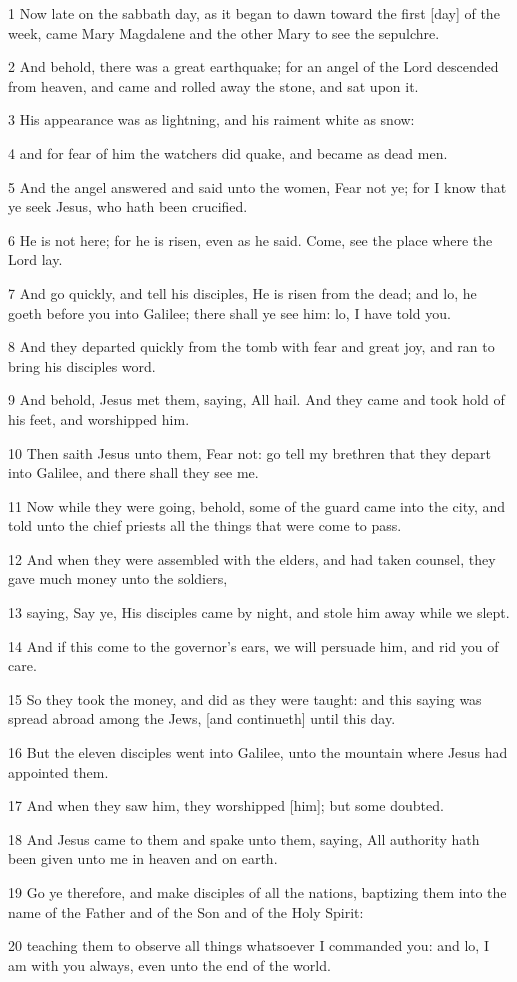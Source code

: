 \par 1 Now late on the sabbath day, as it began to dawn toward the first [day] of the week, came Mary Magdalene and the other Mary to see the sepulchre.
\par 2 And behold, there was a great earthquake; for an angel of the Lord descended from heaven, and came and rolled away the stone, and sat upon it.
\par 3 His appearance was as lightning, and his raiment white as snow:
\par 4 and for fear of him the watchers did quake, and became as dead men.
\par 5 And the angel answered and said unto the women, Fear not ye; for I know that ye seek Jesus, who hath been crucified.
\par 6 He is not here; for he is risen, even as he said. Come, see the place where the Lord lay.
\par 7 And go quickly, and tell his disciples, He is risen from the dead; and lo, he goeth before you into Galilee; there shall ye see him: lo, I have told you.
\par 8 And they departed quickly from the tomb with fear and great joy, and ran to bring his disciples word.
\par 9 And behold, Jesus met them, saying, All hail. And they came and took hold of his feet, and worshipped him.
\par 10 Then saith Jesus unto them, Fear not: go tell my brethren that they depart into Galilee, and there shall they see me.
\par 11 Now while they were going, behold, some of the guard came into the city, and told unto the chief priests all the things that were come to pass.
\par 12 And when they were assembled with the elders, and had taken counsel, they gave much money unto the soldiers,
\par 13 saying, Say ye, His disciples came by night, and stole him away while we slept.
\par 14 And if this come to the governor's ears, we will persuade him, and rid you of care.
\par 15 So they took the money, and did as they were taught: and this saying was spread abroad among the Jews, [and continueth] until this day.
\par 16 But the eleven disciples went into Galilee, unto the mountain where Jesus had appointed them.
\par 17 And when they saw him, they worshipped [him]; but some doubted.
\par 18 And Jesus came to them and spake unto them, saying, All authority hath been given unto me in heaven and on earth.
\par 19 Go ye therefore, and make disciples of all the nations, baptizing them into the name of the Father and of the Son and of the Holy Spirit:
\par 20 teaching them to observe all things whatsoever I commanded you: and lo, I am with you always, even unto the end of the world.

